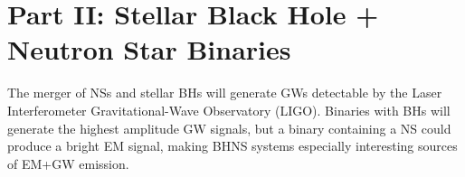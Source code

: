 	











































\section{Part II: Stellar Black Hole + Neutron Star Binaries}
%

The merger of NSs and stellar BHs will generate GWs detectable by the Laser
Interferometer Gravitational-Wave Observatory (LIGO). Binaries with BHs will
generate the highest amplitude GW signals, but a binary containing a NS could
produce a bright EM signal, making BHNS systems especially interesting sources
of EM+GW emission.

